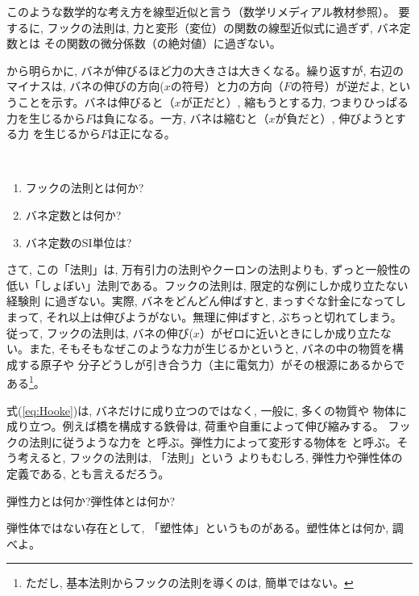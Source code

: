 このような数学的な考え方を線型近似と言う（数学リメディアル教材参照）。
要するに, フックの法則は, 力と変形（変位）の関数の線型近似式に過ぎず, バネ定数とは
その関数の微分係数（の絶対値）に過ぎない。

から明らかに, バネが伸びるほど力の大きさは大きくなる。繰り返すが, 
右辺のマイナスは, バネの伸びの方向($x$の符号）と力の方向（$F$の符号）が逆だよ, 
ということを示す。バネは伸びると（$x$が正だと）, 縮もうとする力, つまりひっぱる
力を生じるから$F$は負になる。一方, バネは縮むと（$x$が負だと）, 伸びようとする力
を生じるから$F$は正になる。

\begin{q}\label{q:Hooke_law}　
\begin{enumerate}
\item フックの法則とは何か?
\item バネ定数とは何か?
\item バネ定数のSI単位は?
\end{enumerate}
\end{q}
\mv

さて, この「法則」は, 万有引力の法則やクーロンの法則よりも, ずっと一般性の
低い「しょぼい」法則である。フックの法則は, 限定的な例にしか成り立たない経験則
に過ぎない。実際, バネをどんどん伸ばすと, まっすぐな針金になってしまって, 
それ以上は伸びようがない。無理に伸ばすと, ぶちっと切れてしまう。従って, 
フックの法則は, バネの伸び($x$）がゼロに近いときにしか成り立たない。また, 
そもそもなぜこのような力が生じるかというと, バネの中の物質を構成する原子や
分子どうしが引き合う力（主に電気力）がその根源にあるからである\footnote{ただし, 
基本法則からフックの法則を導くのは, 簡単ではない。}。

式(\ref{eq:Hooke})は, バネだけに成り立つのではなく, 一般に, 多くの物質や
物体に成り立つ。例えば橋を構成する鉄骨は, 荷重や自重によって伸び縮みする。
フックの法則に従うような力を
と呼ぶ。弾性力によって変形する物体を
と呼ぶ。そう考えると, フックの法則は, 「法則」という
よりもむしろ, 弾性力や弾性体の定義である, とも言えるだろう。


\begin{q}\label{q:elasticity}
弾性力とは何か?弾性体とは何か?
\end{q}
\mv

\begin{q}\label{q:plasticity}
弾性体ではない存在として, 「塑性体」というものがある。塑性体とは何か, 調べよ。
\end{q}
\mv

